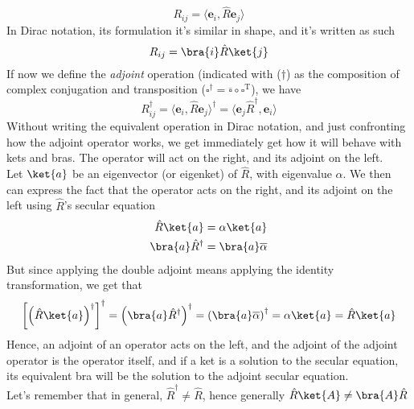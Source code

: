\documentclass[a4paper, 11pt]{book}
\renewcommand{\vec}[1]{\mathbf{#1}}
\newcommand{\1}{\opr{\mathds{1}}}
\newcommand{\opr}[1]{\hat{#1}}
\newcommand{\adj}[2][]{#2^{\dagger#1}}
\theoremstyle{plain}
\begin{document}
	\begin{equation*}
		R_{ij}=\langle\vec{e}_i,\opr{R}\vec{e}_j\rangle
	\end{equation*}
	In Dirac notation, its formulation it's similar in shape, and it's written as such
	\begin{equation*}
		R_{ij}=\bra{i}\opr{R}\ket{j}
	\end{equation*}
	If now we define the \textit{adjoint} operation (indicated with ($\dagger$) as the composition of complex conjugation and transposition ($\square^{\dagger}=\overline{\square}\circ\square^{\text{T}}$), we have
	\begin{equation*}
		\adj{R_{ij}}=\adj{\langle\vec{e}_i,\opr{R}\vec{e}_j\rangle}=\langle\vec{e}_j\adj{\opr{R}},\vec{e}_i\rangle
	\end{equation*}
	Without writing the equivalent operation in Dirac notation, and just confronting how the adjoint operator works, we get immediately get how it will behave with kets and bras. The operator will act on the right, and its adjoint on the left.\\
	Let $\ket{a}$ be an eigenvector (or eigenket) of $\opr{R}$, with eigenvalue $\alpha$. We then can express the fact that the operator acts on the right, and its adjoint on the left using $\opr{R}$'s secular equation
	\begin{equation*}
		\begin{aligned}
			\opr{R}\ket{a}&=\alpha\ket{a}\\
			\bra{a}\adj{\opr{R}}&=\bra{a}\overline{\alpha}
		\end{aligned}
	\end{equation*}
	But since applying the double adjoint means applying the identity transformation, we get that
	\begin{equation*}
		\adj{\left[\adj{\left( \opr{R}\ket{a} \right)}\right]}=\adj{\left(\bra{a}\adj{\opr{R}}\right)}=\adj{\left(\bra{a}\overline{\alpha}\right)}=\alpha\ket{a}=\opr{R}\ket{a}
	\end{equation*}
	Hence, an adjoint of an operator acts on the left, and the adjoint of the adjoint operator is the operator itself, and if a ket is a solution to the secular equation, its equivalent bra will be the solution to the adjoint secular equation.\\
	Let's remember that in general, $\adj{\opr{R}}\ne\opr{R}$, hence generally $\opr{R}\ket{A}\ne\bra{A}\opr{R}$
\end{document}
